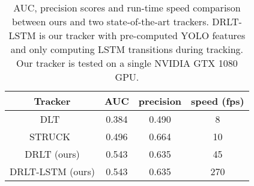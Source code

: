 \documentclass[10pt,twocolumn,letterpaper]{article}
\begin{document}
\begin{table}[t]
\footnotesize
\begin{center}
\begin{tabular}{|c|c|c|c|}
\hline
Tracker & AUC & precision & speed (fps)\\
\hline\hline
DLT~\cite{wang2013learning} & 0.384 & 0.490 & 8 \\
STRUCK~\cite{hare2011struck} & 0.496 & 0.664 & 10 \\
DRLT (ours) & 0.543 & 0.635 & 45 \\
DRLT-LSTM (ours) & 0.543 & 0.635 & 270 \\
\hline
\end{tabular}
\end{center}
\caption{AUC, precision scores and run-time speed comparison between ours and two state-of-the-art trackers. DRLT-LSTM is our tracker with pre-computed YOLO features and only computing LSTM transitions during tracking. Our tracker is tested on a single NVIDIA GTX 1080 GPU.}
\label{tb:comp_table}
\vspace{-3ex}
\end{table}
\end{document}
